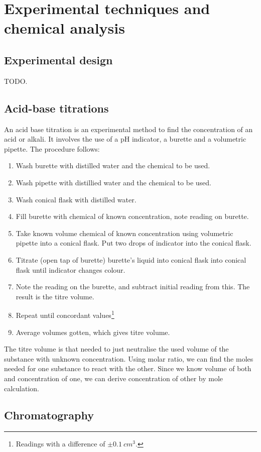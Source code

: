 \section{Experimental techniques and chemical analysis}
\subsection{Experimental design}
TODO.

\subsection{Acid-base titrations}
An acid base titration is an experimental method to find the concentration of an acid or alkali. It
involves the use of a pH indicator, a burette and a volumetric pipette. The procedure follows:
\begin{enumerate}
	\item Wash burette with distilled water and the chemical to be used.
	\item Wash pipette with distillied water and the chemical to be used.
	\item Wash conical flask with distilled water.
	\item Fill burette with chemical of known concentration, note reading on burette.
	\item Take known volume chemical of known concentration using volumetric pipette into a conical
		flask. Put two drops of indicator into the conical flask.
	\item Titrate (open tap of burette) burette's liquid into conical flask into conical flask
		until indicator changes colour.
	\item Note the reading on the burette, and subtract initial reading from this. The result is
		the titre volume.
	\item Repeat until concordant values\footnote{Readings with a difference of $\pm \SI{0.1}{cm^3}$.}
	\item Average volumes gotten, which gives titre volume.
\end{enumerate}

The titre volume is that needed to just neutralise the used volume of the substance with unknown
concentration. Using molar ratio, we can find the moles needed for one substance to react with the
other. Since we know volume of both and concentration of one, we can derive concentration of 
other by mole calculation.

\subsection{Chromatography}

